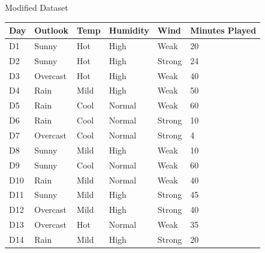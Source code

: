 \documentclass[usenames,dvipsnames]{beamer}
\begin{document}
\begin{frame}{Modified Dataset}
\begin{table}[]
	\begin{tabular}{@{}llllll@{}}
		\toprule
		\textbf{Day} & \textbf{Outlook} & \textbf{Temp} & \textbf{Humidity} & \textbf{Wind} & \textbf{Minutes Played} \\ \midrule
		D1           & Sunny            & Hot           & High              & Weak          & 20                      \\
		D2           & Sunny            & Hot           & High              & Strong        & 24                      \\
		D3           & Overcast         & Hot           & High              & Weak          & 40                      \\
		D4           & Rain             & Mild          & High              & Weak          & 50                      \\
		D5           & Rain             & Cool          & Normal            & Weak          & 60                      \\
		D6           & Rain             & Cool          & Normal            & Strong        & 10                      \\
		D7           & Overcast         & Cool          & Normal            & Strong        & 4                       \\
		D8           & Sunny            & Mild          & High              & Weak          & 10                      \\
		D9           & Sunny            & Cool          & Normal            & Weak          & 60                      \\
		D10          & Rain             & Mild          & Normal            & Weak          & 40                      \\
		D11          & Sunny            & Mild          & High              & Strong        & 45                      \\
		D12          & Overcast         & Mild          & High              & Strong        & 40                      \\
		D13          & Overcast         & Hot           & Normal            & Weak          & 35                      \\
		D14          & Rain             & Mild          & High              & Strong        & 20                      \\ \bottomrule
	\end{tabular}
\end{table}
\end{frame}
\end{document}
